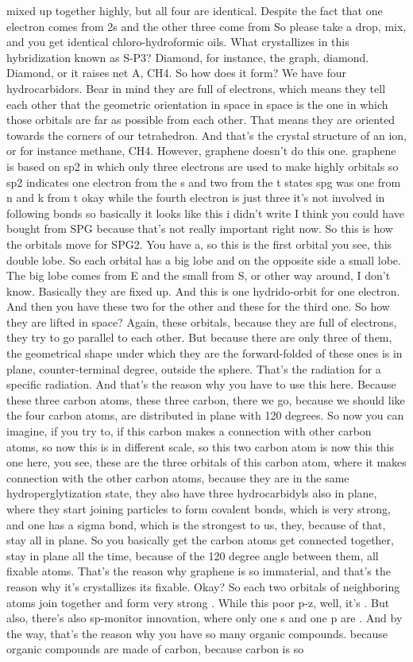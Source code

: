 mixed up together highly, but all four are identical. Despite the fact that one electron comes from 2s and the other three come from So please take a drop, mix, and you get identical chloro-hydroformic oils. What crystallizes in this hybridization known as S-P3? Diamond, for instance, the graph, diamond. Diamond, or it raises net A, CH4. So how does it form? We have four hydrocarbidors. Bear in mind they are full of electrons, which means they tell each other that the geometric orientation in space in space is the one in which those orbitals are far as possible from each other. That means they are oriented towards the corners of our tetrahedron. And that's the crystal structure of an ion, or for instance methane, CH4. However, graphene doesn't do this one. graphene is based on sp2 in which only three electrons are used to make highly orbitals so sp2 indicates one electron from the s and two from the t states spg was one from n and k from t okay while the fourth electron is just three it's not involved in following bonds so basically it looks like this i didn't write I think you could have bought from SPG because that's not really important right now. So this is how the orbitals move for SPG2. You have a, so this is the first orbital you see, this double lobe. So each orbital has a big lobe and on the opposite side a small lobe. The big lobe comes from E and the small from S, or other way around, I don't know. Basically they are fixed up. And this is one hydrido-orbit for one electron. And then you have these two for the other and these for the third one. So how they are lifted in space? Again, these orbitals, because they are full of electrons, they try to go parallel to each other. But because there are only three of them, the geometrical shape under which they are the forward-folded of these ones is in plane, counter-terminal degree, outside the sphere. That's the radiation for a specific radiation. And that's the reason why you have to use this here. Because these three carbon atoms, these three carbon, there we go, because we should like the four carbon atoms, are distributed in plane with 120 degrees. So now you can imagine, if you try to, if this carbon makes a connection with other carbon atoms, so now this is in different scale, so this two carbon atom is now this this one here, you see, these are the three orbitals of this carbon atom, where it makes connection with the other carbon atoms, because they are in the same hydroperglytization state, they also have three hydrocarbidyls also in plane, where they start joining particles to form covalent bonds, which is very strong, and one has a sigma bond, which is the strongest to us, they, because of that, stay all in plane. So you basically get the carbon atoms get connected together, stay in plane all the time, because of the 120 degree angle between them, all fixable atoms. That's the reason why graphene is so immaterial, and that's the reason why it's crystallizes its fixable. Okay? So each two orbitals of neighboring atoms join together and form very strong . While this poor p-z, well, it's . But also, there's also sp-monitor innovation, where only one s and one p are . And by the way, that's the reason why you have so many organic compounds. because organic compounds are made of carbon, because carbon is so 
